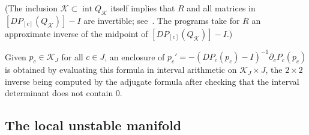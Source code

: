 \documentclass[11pt]{amsart}
\theoremstyle{definition}
\theoremstyle{remark}
\newcommand{\ival}[1]{[#1]}
\newcommand{\Kr}{\mathcal{K}}
\begin{document}
(The inclusion $\Kr\subset\operatorname{int}Q_\Kr$ itself implies that $R$ and all matrices in
$\ival{DP_{\ival c}(Q_\Kr)}-I$ are invertible; see~\cite[Chapter~5]{Neumaier90}. The programs take for
$R$ an approximate inverse of the midpoint of $\ival{DP_{\ival c}(Q_\Kr)}-I$.)

Given $p_c\in\Kr_J$ for all $c\in J$, an enclosure of $p_c'=-(DP_c(p_c)-I)^{-1}\partial_cP_c(p_c)$ is
obtained by evaluating this formula in interval arithmetic on $\Kr_J\times J$, the $2\times 2$ inverse being
computed by the adjugate formula after checking that the interval determinant does not contain $0$.

\subsection{The local unstable manifold}
\end{document}
